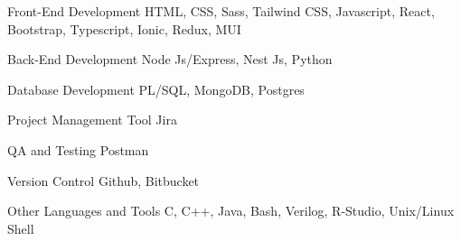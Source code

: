 \newcommand{\Csh}{C{\lserif\#}}



\begin{cvskills}




\cvskill
{Front-End Development} %
{HTML, CSS, Sass, Tailwind CSS, Javascript, React, Bootstrap, Typescript, Ionic, Redux, MUI} %


\cvskill
{Back-End Development} %
{Node Js/Express, Nest Js, Python} %


\cvskill
{Database Development} %
{PL/SQL, MongoDB, Postgres} %





\cvskill
{Project Management Tool} %
{Jira} %


\cvskill
{QA and Testing} %
{Postman} %


\cvskill
{Version Control} %
{Github, Bitbucket} %


\cvskill
{Other Languages and Tools} %
{C, C++, Java, Bash, Verilog, R-Studio, Unix/Linux Shell} %


\end{cvskills}